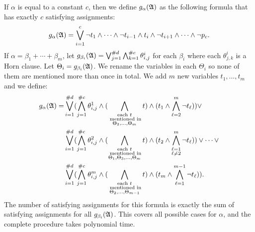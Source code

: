 If $\alpha$ is equal to a constant $c$, then we define $g_{\alpha}(\mathfrak{A})$ as the following formula that has exactly $c$ satisfying assignments:
$$
g_{\alpha}(\mathfrak{A}) = \bigvee_{i = 1}^{c}\neg t_1 \wedge \cdots \wedge \neg t_{i-1} \wedge t_i \wedge \neg t_{i+1} \wedge \cdots \wedge \neg p_c.
$$ 
If $\alpha = \beta_1 + \cdots + \beta_m$, let $g_{\beta_i}(\mathfrak{A}) = \bigvee_{j = 1}^{\#d}\bigwedge_{k = 1}^{\#c}\theta^i_{i,j}$ for each $\beta_i$ where each $\theta^i_{j,k}$ is a Horn clause. Let $\Theta_i = g_{\beta_i}(\mathfrak{A})$. We rename the variables in each $\Theta_i$ so none of them are mentioned more than once in total. We add $m$ new variables $t_1,\ldots,t_m$ and we define:
\begin{align*}
g_{\alpha}(\mathfrak{A}) = &\bigvee_{i = 1}^{\#d}(\bigwedge_{j = 1}^{\#c}\theta^1_{i,j} \wedge (\bigwedge\limits_{\substack{\text{each } t\\ \text{ mentioned in}\\ \Theta_2,\ldots,\Theta_{m}}}t) \wedge (t_1 \wedge \bigwedge_{\ell = 2}^{m} \neg t_{\ell})) \vee \\ 
&\bigvee_{i = 1}^{\#d}(\bigwedge_{j = 1}^{\#c}\theta^2_{i,j} \wedge (\bigwedge\limits_{\substack{\text{each $t$}\\ \text{ mentioned in}\\ \Theta_1,\Theta_3,\ldots,\Theta_{m}}}t) \wedge (t_2 \wedge \bigwedge\limits_{\substack{\ell = 1 \\ \ell \neq 2}}^{m} \neg t_{\ell})) \vee \cdots \vee\\ 
&\bigvee_{i = 1}^{\#d}(\bigwedge_{j = 1}^{\#c}\theta^m_{i,j} \wedge (\bigwedge\limits_{\substack{\text{each } t\\ \text{ mentioned in}\\ \Theta_2,\ldots,\Theta_{m-1}}}t) \wedge (t_m \wedge \bigwedge_{\ell = 1}^{m-1} \neg t_{\ell})).
\end{align*}
The number of satisfying assignments for this formula is exactly the sum of satisfying assignments for all $g_{\beta_i}(\mathfrak{A})$. This covers all possible cases for $\alpha$, and the complete procedure takes polynomial time.

